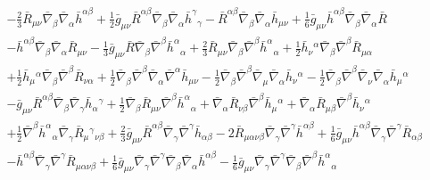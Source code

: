 \documentclass[10pt,letterpaper]{article}
\begin{document}
\begin{align}
& -  \tfrac{2}{3} \bar R_{\mu \nu} \bar\nabla_{\beta}\bar\nabla_{\alpha}\bar h^{\alpha \beta}
 + \tfrac{1}{2} \bar g_{\mu \nu} \bar R^{\alpha \beta} \bar\nabla_{\beta}\bar\nabla_{\alpha}\bar h^{\gamma}{}_{\gamma}
 -  \bar R^{\alpha \beta} \bar\nabla_{\beta}\bar\nabla_{\alpha}\bar h_{\mu \nu}
 + \tfrac{1}{6} \bar g_{\mu \nu} \bar h^{\alpha \beta} \bar\nabla_{\beta}\bar\nabla_{\alpha}\bar R\nonumber\\
& -  \bar h^{\alpha \beta} \bar\nabla_{\beta}\bar\nabla_{\alpha}\bar R_{\mu \nu}
 -  \tfrac{1}{3} \bar g_{\mu \nu} \bar R \bar\nabla_{\beta}\bar\nabla^{\beta}\bar h^{\alpha}{}_{\alpha}
 + \tfrac{2}{3} \bar R_{\mu \nu} \bar\nabla_{\beta}\bar\nabla^{\beta}\bar h^{\alpha}{}_{\alpha}
 + \tfrac{1}{2} \bar h_{\nu}{}^{\alpha} \bar\nabla_{\beta}\bar\nabla^{\beta}\bar R_{\mu \alpha}\nonumber\\
& + \tfrac{1}{2} \bar h_{\mu}{}^{\alpha} \bar\nabla_{\beta}\bar\nabla^{\beta}\bar R_{\nu \alpha}
 + \tfrac{1}{2} \bar\nabla_{\beta}\bar\nabla^{\beta}\bar\nabla_{\alpha}\bar\nabla^{\alpha}\bar h_{\mu \nu}
 -  \tfrac{1}{2} \bar\nabla_{\beta}\bar\nabla^{\beta}\bar\nabla_{\mu}\bar\nabla_{\alpha}\bar h_{\nu}{}^{\alpha}
 -  \tfrac{1}{2} \bar\nabla_{\beta}\bar\nabla^{\beta}\bar\nabla_{\nu}\bar\nabla_{\alpha}\bar h_{\mu}{}^{\alpha}\nonumber\\
& -  \bar g_{\mu \nu} \bar R^{\alpha \beta} \bar\nabla_{\beta}\bar\nabla_{\gamma}\bar h_{\alpha}{}^{\gamma}
 + \tfrac{1}{2} \bar\nabla_{\beta}\bar R_{\mu \nu} \bar\nabla^{\beta}\bar h^{\alpha}{}_{\alpha}
 + \bar\nabla_{\alpha}\bar R_{\nu \beta} \bar\nabla^{\beta}\bar h_{\mu}{}^{\alpha}
 + \bar\nabla_{\alpha}\bar R_{\mu \beta} \bar\nabla^{\beta}\bar h_{\nu}{}^{\alpha}\nonumber\\
& + \tfrac{1}{2} \bar\nabla^{\beta}\bar h^{\alpha}{}_{\alpha} \bar\nabla_{\gamma}\bar R_{\mu}{}^{\gamma}{}_{\nu \beta}
 + \tfrac{2}{3} \bar g_{\mu \nu} \bar R^{\alpha \beta} \bar\nabla_{\gamma}\bar\nabla^{\gamma}\bar h_{\alpha \beta}
 - 2 \bar R_{\mu \alpha \nu \beta} \bar\nabla_{\gamma}\bar\nabla^{\gamma}\bar h^{\alpha \beta}
 + \tfrac{1}{6} \bar g_{\mu \nu} \bar h^{\alpha \beta} \bar\nabla_{\gamma}\bar\nabla^{\gamma}\bar R_{\alpha \beta}\nonumber\\
& -  \bar h^{\alpha \beta} \bar\nabla_{\gamma}\bar\nabla^{\gamma}\bar R_{\mu \alpha \nu \beta}
 + \tfrac{1}{6} \bar g_{\mu \nu} \bar\nabla_{\gamma}\bar\nabla^{\gamma}\bar\nabla_{\beta}\bar\nabla_{\alpha}\bar h^{\alpha \beta}
 -  \tfrac{1}{6} \bar g_{\mu \nu} \bar\nabla_{\gamma}\bar\nabla^{\gamma}\bar\nabla_{\beta}\bar\nabla^{\beta}\bar h^{\alpha}{}_{\alpha}\nonumber\\

\end{align}
\end{document}
